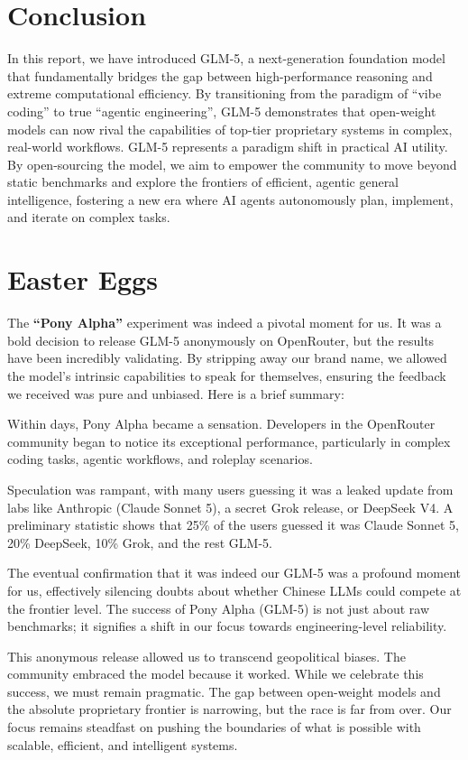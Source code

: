 \section{Conclusion}

In this report, we have introduced GLM-5, a next-generation foundation model that fundamentally bridges the gap between high-performance reasoning and extreme computational efficiency. By transitioning from the paradigm of ``vibe coding'' to true ``agentic engineering'', GLM-5 demonstrates that open-weight models can now rival the capabilities of top-tier proprietary systems in complex, real-world workflows.
GLM-5 represents a paradigm shift in practical AI utility. By open-sourcing the model, we aim to empower the community to move beyond static benchmarks and explore the frontiers of efficient, agentic general intelligence, fostering a new era where AI agents autonomously plan, implement, and iterate on complex tasks.


\section{Easter Eggs}
The \textbf{``Pony Alpha''} experiment was indeed a pivotal moment for us. It was a bold decision to release GLM-5 anonymously on OpenRouter, but the results have been incredibly validating. By stripping away our brand name, we allowed the model's intrinsic capabilities to speak for themselves, ensuring the feedback we received was pure and unbiased.
Here is a brief summary:


Within days, Pony Alpha became a sensation. Developers in the OpenRouter community began to notice its exceptional performance, particularly in complex coding tasks, agentic workflows, and roleplay scenarios.

Speculation was rampant, with many users guessing it was a leaked update from labs like Anthropic (Claude Sonnet 5), a secret Grok release, or DeepSeek V4. A preliminary statistic shows that 25\% of the users guessed it was Claude Sonnet 5, 20\% DeepSeek, 10\% Grok, and the rest GLM-5.

The eventual confirmation that it was indeed our GLM-5 was a profound moment for us, effectively silencing doubts about whether Chinese LLMs could compete at the frontier level. 
%
The success of Pony Alpha (GLM-5) is not just about raw benchmarks; it signifies a shift in our focus towards engineering-level reliability.

This anonymous release allowed us to transcend geopolitical biases. The community embraced the model because it worked.
%
While we celebrate this success, we must remain pragmatic. The gap between open-weight models and the absolute proprietary frontier is narrowing, but the race is far from over. Our focus remains steadfast on pushing the boundaries of what is possible with scalable, efficient, and intelligent systems.